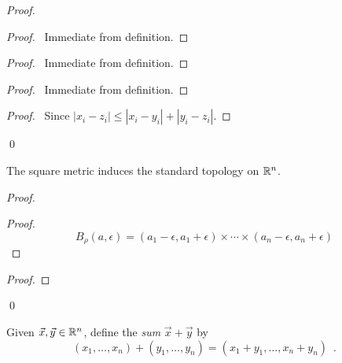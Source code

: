 \begin{proof}
    \pf
    \begin{proof}
        \pf\ Immediate from definition.
    \end{proof}
    \begin{proof}
        \pf\ Immediate from definition.
    \end{proof}
    \begin{proof}
        \pf\ Immediate from definition.
    \end{proof}
    \begin{proof}
        \pf\ Since $|x_i - z_i| \leq |x_i - y_i| + |y_i - z_i|$.
    \end{proof}
    \qed
\end{proof}

\begin{proposition}
    The square metric induces the standard topology on $\mathbb{R}^n$.
\end{proposition}

\begin{proof}
    \pf
    \begin{proof}
        \pf
        \[ B_\rho(a, \epsilon) = (a_1 - \epsilon, a_1 + \epsilon) \times \cdots \times (a_n - \epsilon, a_n + \epsilon) \]
    \end{proof}
    \begin{proof}
    \end{proof}
    \qed
\end{proof}

\begin{definition}
    Given $\vec{x}, \vec{y} \in \mathbb{R}^n$, define the \emph{sum} $\vec{x} + \vec{y}$ by
    \[ (x_1, \ldots, x_n) + (y_1, \ldots, y_n) = (x_1 + y_1, \ldots, x_n + y_n) \enspace . \]
\end{definition}

